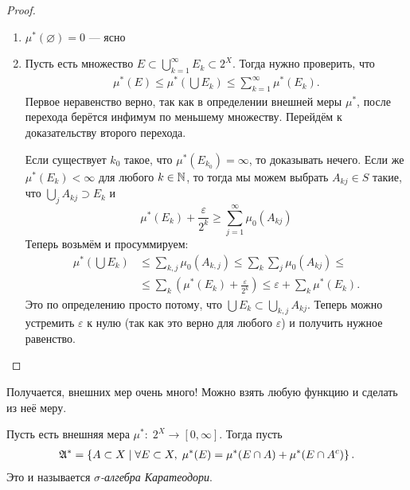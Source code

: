 \begin{proof}\
 \begin{enumerate}
  \item $ \mu^\ast(\varnothing) = 0 $ --- ясно
  \item Пусть есть множество $ E \subset \bigcup_{k=1}^{\infty} E_k \subset 2^X$.
      Тогда нужно проверить, что 
   \begin{align*}
    \mu^\ast\left( E \right) \leqslant
    \mu^\ast\left( \bigcup E_k \right) \leqslant \sum_{k=1}^{\infty} \mu^\ast(E_k)
   .\end{align*} Первое неравенство верно, так как в определении внешней меры $ \mu^* $, после перехода берётся инфимум по меньшему множеству. Перейдём к доказательству второго перехода.

   Если существует $ k_0 $ такое, что $ \mu^\ast(E_{k_0}) = \infty $, то доказывать нечего. Если же $ \mu^\ast(E_k) < \infty $ для любого $ k \in \mathbb{N} $, то тогда мы можем выбрать $ A_{kj} \in S $ такие, что $ \bigcup_j A_{kj} \supset E_k $ и $$ \mu^\ast(E_k) + \frac{\varepsilon}{2^k} \geqslant \sum_{j=1}^{\infty} \mu_0(A_{kj}) $$ Теперь возьмём и просуммируем:
   \begin{align*}
    \mu^\ast\left( \bigcup E_k \right) &\leqslant \sum_{k,j} \mu_0(A_{k,j}) \leqslant \sum_k \sum_j \mu_0(A_{kj}) \leqslant \\ &\leqslant \sum_{k} \left(\mu^\ast(E_k) + \frac{\varepsilon}{2^k} \right) \leqslant \varepsilon + \sum_k \mu^\ast(E_k)
   .\end{align*} Это по определению просто потому, что $ \bigcup E_k \subset \bigcup_{k,j} A_{kj} $. Теперь можно устремить $ \varepsilon $ к нулю (так как это верно для любого $ \varepsilon $) и получить нужное равенство.
 \end{enumerate}
\end{proof}
Получается, внешних мер очень много! Можно взять любую функцию и сделать из неё меру.

\begin{df}
 Пусть есть внешняя мера $ \mu^\ast \colon\; 2^X \to [0,\infty] $. Тогда пусть \begin{align*}
  \mathfrak{A}^\ast = \left\{ A \subset X \mid \forall E \subset X, \; \mu^\ast(E) = \mu^\ast (E \cap A) + \mu^\ast(E \cap A^c) \right\} 
 .\end{align*}
 Это и называется \textit{$ \sigma $-алгебра Каратеодори}.
\end{df}

